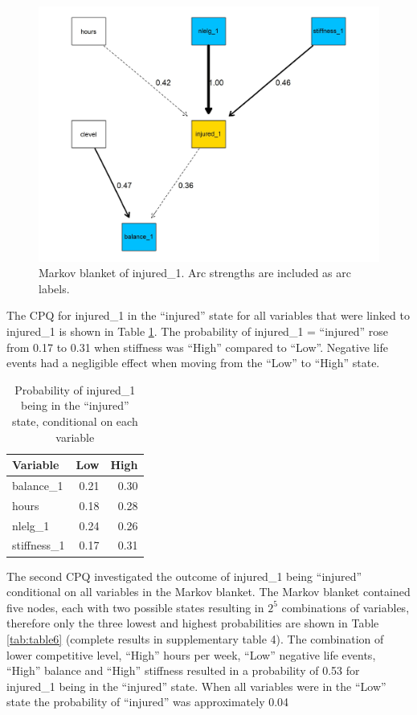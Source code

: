 \documentclass[
  english,
  man]{apa6}
\begin{document}
\begin{figure}

{\centering \includegraphics[width=1\linewidth]{figures_doc/Fig7} 

}

\caption{Markov blanket of injured\_1. Arc strengths are included as arc labels.}\label{fig:fig7}
\end{figure}

The CPQ for injured\_1 in the ``injured'' state for all variables that were linked to injured\_1 is shown in Table \ref{tab:table5}.
The probability of injured\_1 = ``injured'' rose from 0.17 to 0.31 when stiffness was ``High'' compared to ``Low''.
Negative life events had a negligible effect when moving from the ``Low'' to ``High'' state.

\begin{table}[H]

\caption{\label{tab:table5}Probability of injured\_1 being in the ``injured'' state, conditional on each variable}
\centering
\begin{tabular}[t]{l|r|r}
\hline
\textbf{Variable} & \textbf{Low} & \textbf{High}\\
\hline
balance\_1 & 0.21 & 0.30\\
\hline
hours & 0.18 & 0.28\\
\hline
nlelg\_1 & 0.24 & 0.26\\
\hline
stiffness\_1 & 0.17 & 0.31\\
\hline
\end{tabular}
\end{table}

The second CPQ investigated the outcome of injured\_1 being ``injured'' conditional on all variables in the Markov blanket.
The Markov blanket contained five nodes, each with two possible states resulting in \(2^5\) combinations of variables, therefore only the three lowest and highest probabilities are shown in Table \ref{tab:table6} (complete results in supplementary table 4).
The combination of lower competitive level, ``High'' hours per week, ``Low'' negative life events, ``High'' balance and ``High'' stiffness resulted in a probability of 0.53 for injured\_1 being in the ``injured'' state.
When all variables were in the ``Low'' state the probability of ``injured'' was approximately 0.04
\end{document}
